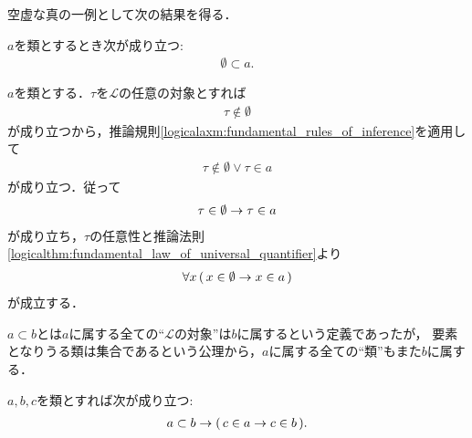 	空虚な真の一例として次の結果を得る．
	
	\begin{screen}
		\begin{thm}[空集合は全ての類に含まれる]\label{thm:emptyset_if_a_subset_of_every_class}
			$a$を類とするとき次が成り立つ:
			\begin{align}
				\emptyset \subset a.
			\end{align}
		\end{thm}
	\end{screen}
	
	\begin{prf}
		$a$を類とする．$\tau$を$\mathcal{L}$の任意の対象とすれば
		\begin{align}
			\tau \notin \emptyset
		\end{align}
		が成り立つから，推論規則\ref{logicalaxm:fundamental_rules_of_inference}を適用して
		\begin{align}
			\tau \notin \emptyset \vee \tau \in a
		\end{align}
		が成り立つ．従って
		\begin{align}
			\tau \in \emptyset \rightarrow \tau \in a
		\end{align}
		が成り立ち，$\tau$の任意性と推論法則\ref{logicalthm:fundamental_law_of_universal_quantifier}より
		\begin{align}
			\forall x\, (\, x \in \emptyset \rightarrow x \in a\, )
		\end{align}
		が成立する．
		\QED
	\end{prf}
	
	$a \subset b$とは$a$に属する全ての``$\mathcal{L}$の対象''は$b$に属するという定義であったが，
	要素となりうる類は集合であるという公理から，$a$に属する全ての``類''もまた$b$に属する．
	
	\begin{screen}
		\begin{thm}[類はその部分類に属する全ての類を要素に持つ]\label{thm:subclass_contains_all_elements}
			$a,b,c$を類とすれば次が成り立つ:
			\begin{align}
				a \subset b \rightarrow (\, c \in a \rightarrow c \in b\, ).
			\end{align}
		\end{thm}
	\end{screen}
	
